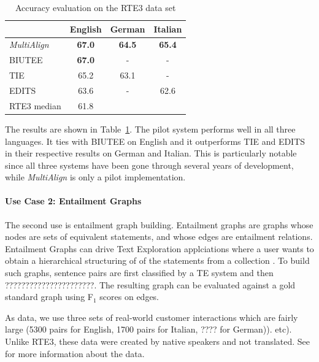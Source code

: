 \documentclass[11pt,letterpaper]{article}
\begin{document}
\begin{table}[t!]
\centering
\small
\begin{tabular}{l|ccc}
          &   English   &   German   &   Italian \\
\hline
{\em MultiAlign}&   \textbf{67.0}      &   \textbf{64.5}    &  \textbf{65.4}  \\
BIUTEE        &   \textbf{67.0}      &     -       &     -    \\
TIE           &   65.2       &   63.1    &     -    \\ 
EDITS         &   63.6      &     -       &  62.6  \\ \hline
RTE3 median   &   61.8      &             &          \\

\end{tabular}
\caption{Accuracy evaluation on the RTE3 data set}
\label{table:rte3}
\end{table}

The results are shown in Table~\ref{table:rte3}. The pilot system
performs well in all three languages. It ties with BIUTEE on English
and it outperforms TIE and EDITS in their respective results on German
and Italian. This is particularly notable since all three systems have
been gone through several years of development, while
{\em MultiAlign} is only a pilot implementation.


\paragraph{Use Case 2: Entailment Graphs} The second use is entailment
graph building. Entailment graphs are graphs whose nodes are sets of
equivalent statements, and whose edges are entailment
relations. Entailment Graphs can drive Text Exploration applciations
where a user wants to obtain a hierarchical structuring of of the
statements from a collection \cite{berant2012learning}. To build such
graphs, sentence pairs are first classified by a TE system and then
??????????????????????. The
resulting graph can be evaluated against a gold standard graph using
F$_1$ scores on edges.

As data, we use three sets of real-world customer interactions which
are fairly large (5300 pairs for English, 1700 pairs for Italian, ????
for German)).  etc). Unlike
RTE3, these data were created by native speakers and not translated.
See \cite{} for more information about the data.
\end{document}
